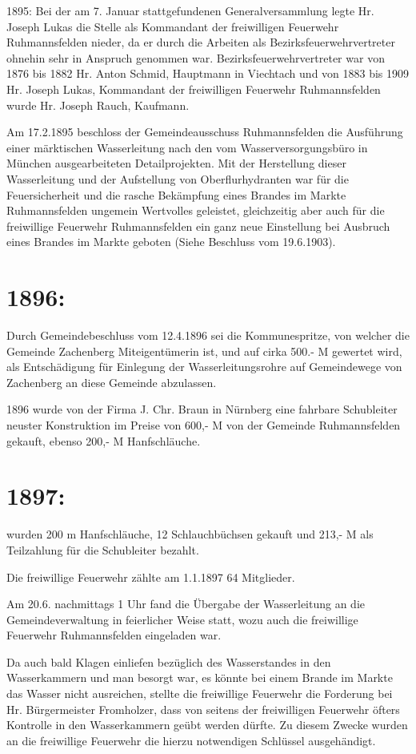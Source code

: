 \documentclass[12pt,a4paper]{book}
\begin{document}
1895:   Bei der am 7. Januar stattgefundenen Generalversammlung legte Hr. Joseph
Lukas die Stelle als Kommandant der freiwilligen Feuerwehr Ruhmannsfelden
nieder, da er durch die Arbeiten als Bezirksfeuerwehrvertreter ohnehin sehr in
Anspruch genommen war. Bezirksfeuerwehrvertreter war von 1876 bis 1882 Hr. Anton
Schmid, Hauptmann in Viechtach und von 1883 bis 1909 Hr. Joseph Lukas,
Kommandant der freiwilligen Feuerwehr Ruhmannsfelden wurde Hr. Joseph Rauch,
Kaufmann.

Am 17.2.1895 beschloss der Gemeindeausschuss Ruhmannsfelden die Ausführung einer
märktischen Wasserleitung nach den vom Wasserversorgungsbüro in München
ausgearbeiteten Detailprojekten. Mit der Herstellung dieser Wasserleitung und
der Aufstellung von Oberflurhydranten war für die Feuersicherheit und die rasche
Bekämpfung eines Brandes im Markte Ruhmannsfelden ungemein Wertvolles geleistet,
gleichzeitig aber auch für die freiwillige Feuerwehr Ruhmannsfelden ein ganz
neue Einstellung bei Ausbruch eines Brandes im Markte geboten (Siehe Beschluss
vom 19.6.1903).

\section{1896:}

Durch Gemeindebeschluss vom 12.4.1896 sei die Kommunespritze, von welcher die
Gemeinde Zachenberg Miteigentümerin ist, und auf cirka 500.- M gewertet wird,
als Entschädigung für Einlegung der Wasserleitungsrohre auf Gemeindewege von
Zachenberg an diese Gemeinde abzulassen.

1896 wurde von der Firma J. Chr. Braun in Nürnberg eine fahrbare Schubleiter
neuster Konstruktion im Preise von 600,- M von der Gemeinde Ruhmannsfelden
gekauft, ebenso 200,- M Hanfschläuche.

\section{1897:}

wurden 200 m Hanfschläuche, 12 Schlauchbüchsen gekauft und 213,- M als
Teilzahlung für die Schubleiter bezahlt.

Die freiwillige Feuerwehr zählte am 1.1.1897 64 Mitglieder.

Am 20.6. nachmittags 1 Uhr fand die Übergabe der Wasserleitung an die
Gemeindeverwaltung in feierlicher Weise statt, wozu auch die freiwillige
Feuerwehr Ruhmannsfelden eingeladen war.

Da auch bald Klagen einliefen bezüglich des Wasserstandes in den Wasserkammern
und man besorgt war, es könnte bei einem Brande im Markte das Wasser nicht
ausreichen, stellte die freiwillige Feuerwehr die Forderung bei Hr.
Bürgermeister Fromholzer, dass von seitens der freiwilligen Feuerwehr öfters
Kontrolle in den Wasserkammern geübt werden dürfte. Zu diesem Zwecke wurden an
die freiwillige Feuerwehr die hierzu notwendigen Schlüssel ausgehändigt.
\end{document}
